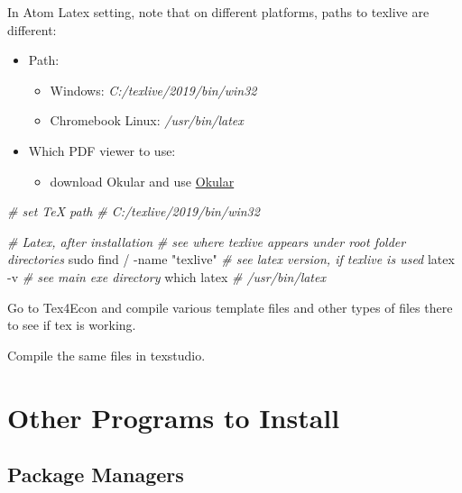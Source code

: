 \documentclass[]{article}
\newenvironment{Shaded}{\begin{snugshade}}{\end{snugshade}}
\newcommand{\CommentTok}[1]{\textcolor[rgb]{0.56,0.35,0.01}{\textit{#1}}}
\newcommand{\ExtensionTok}[1]{#1}
\newcommand{\FunctionTok}[1]{\textcolor[rgb]{0.00,0.00,0.00}{#1}}
\newcommand{\NormalTok}[1]{#1}
\newcommand{\StringTok}[1]{\textcolor[rgb]{0.31,0.60,0.02}{#1}}
\providecommand{\tightlist}{%
  \setlength{\itemsep}{0pt}\setlength{\parskip}{0pt}}
\begin{document}
In Atom Latex setting, note that on different platforms, paths to
texlive are different:

\begin{itemize}
\tightlist
\item
  Path:

  \begin{itemize}
  \tightlist
  \item
    Windows: \emph{C:/texlive/2019/bin/win32}
  \item
    Chromebook Linux: \emph{/usr/bin/latex}
  \end{itemize}
\item
  Which PDF viewer to use:

  \begin{itemize}
  \tightlist
  \item
    download Okular and use \href{https://okular.kde.org/}{Okular}
  \end{itemize}
\end{itemize}

\begin{Shaded}
\begin{Highlighting}[]
\CommentTok{# set TeX path}
\CommentTok{# C:/texlive/2019/bin/win32}

\CommentTok{# Latex, after installation}
\CommentTok{# see where texlive appears under root folder directories}
\FunctionTok{sudo}\NormalTok{ find / -name }\StringTok{"texlive"}
\CommentTok{# see latex version, if texlive is used}
\ExtensionTok{latex}\NormalTok{ -v}
\CommentTok{# see main exe directory}
\FunctionTok{which}\NormalTok{ latex}
\CommentTok{# /usr/bin/latex}
\end{Highlighting}
\end{Shaded}

Go to Tex4Econ and compile various template files and other types of
files there to see if tex is working.

Compile the same files in texstudio.

\hypertarget{other-programs-to-install}{%
\section{Other Programs to Install}\label{other-programs-to-install}}

\hypertarget{package-managers}{%
\subsection{Package Managers}\label{package-managers}}
\end{document}

